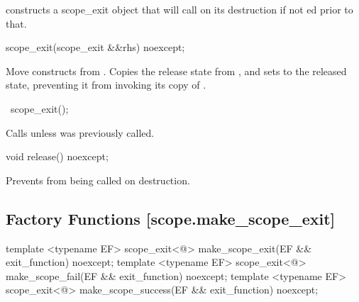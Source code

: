 \documentclass[ebook,11pt,article]{memoir}
\begin{document}
\begin{itemdescr}
\pnum
\effects constructs a scope_exit object that will call  on its destruction if not ed prior to that.
\end{itemdescr}

\begin{itemdecl}
scope_exit(scope_exit  &&rhs) noexcept;
\end{itemdecl}

\begin{itemdescr}
\pnum
\effects Move constructs  from . Copies the release state from , and sets  to the released state, preventing it from invoking its copy of .
\end{itemdescr}

\begin{itemdecl}
~scope_exit();
\end{itemdecl}

\begin{itemdescr}
\pnum
\effects Calls  unless  was previously called.
\end{itemdescr}

\begin{itemdecl}
void release() noexcept;
\end{itemdecl}

\begin{itemdescr}
\pnum
\effects Prevents  from being called on destruction.
\end{itemdescr}


\subsection { Factory Functions [scope.make_scope_exit]}

\begin{itemdecl}
template <typename EF>
scope_exit<@\seebelow@> make_scope_exit(EF && exit_function) noexcept;
template <typename EF>
scope_exit<@\seebelow@> make_scope_fail(EF && exit_function) noexcept;
template <typename EF>
scope_exit<@\seebelow@> make_scope_success(EF && exit_function) noexcept;
\end{itemdecl}
\end{document}
